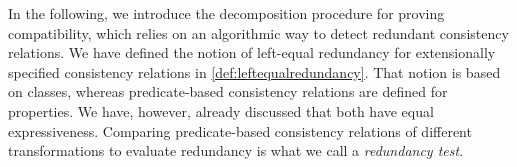 In the following, we introduce the decomposition procedure for proving compatibility, which relies on an algorithmic way to detect redundant consistency relations. 
We have defined the notion of left-equal redundancy for extensionally specified consistency relations in \autoref{def:leftequalredundancy}.
That notion is based on classes, whereas predicate-based consistency relations are defined for properties.
We have, however, already discussed that both have equal expressiveness.
Comparing predicate-based consistency relations of different transformations to evaluate redundancy is what we call a 
\emph{redundancy test}.

